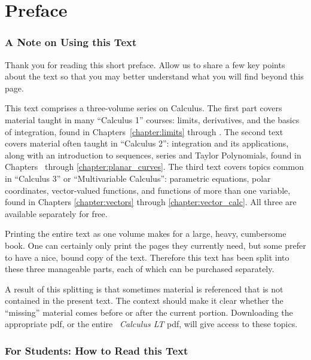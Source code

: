 \prefacegeometry
\chapter*{Preface}
\pagestyle{plain} %
\thispagestyle{empty}

\subsection{A Note on Using this Text}

Thank you for reading this short preface. Allow us to share a few key points about the text so that you may better understand what you will find beyond this page.

This text comprises a three-volume series on Calculus.
The first part covers material taught in many ``Calculus 1'' courses: limits, derivatives, and the basics of integration, found in Chapters~\ref{chapter:limits} through
\iftoggle{bsc}{\ref{chapter:integration}}{\ref{chapter:app_of_int}}.
The second text covers material often taught in ``Calculus 2'': integration and its applications, along with an introduction to sequences, series and Taylor Polynomials, found in
Chapters~\iftoggle{bsc}{\ref{chapter:app_of_int}}{\ref{chapter:diff_conc}}
through \ref{chapter:planar_curves}. The third text covers topics common in ``Calculus 3'' or ``Multivariable Calculus'': parametric equations, polar coordinates, vector-valued functions, and functions of more than one variable, found in Chapters \ref{chapter:vectors} through \ref{chapter:vector_calc}. All three are available separately for free.

Printing the entire text as one volume makes for a large, heavy, cumbersome book. One can certainly only print the pages they currently need, but some prefer to have a nice, bound copy of the text. Therefore this text has been split into these three manageable parts, each of which can be purchased separately.

A result of this splitting is that sometimes material is referenced that is not contained in the present text. The context should make it clear whether the ``missing'' material comes before or after the current portion. Downloading the appropriate pdf, or the entire \emph{\apex\ Calculus LT} pdf, will give access to these topics.

\subsection{For Students: How to Read this Text}

